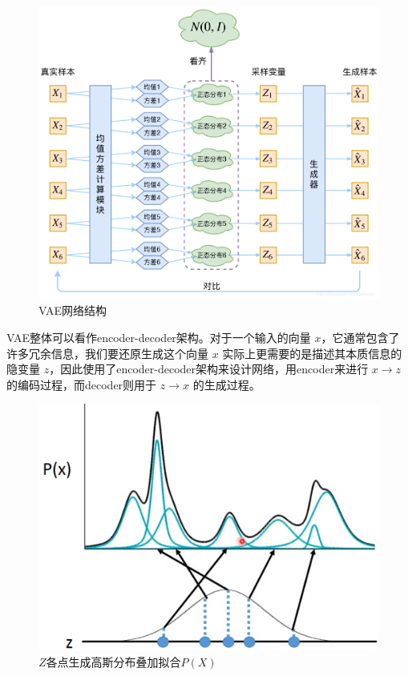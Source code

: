 \documentclass[12pt,a4paper,UTF8]{article}
\begin{document}
\begin{figure}[htb]\centering\includegraphics[scale=0.36]{./figure/3.png}\caption{VAE网络结构}\label{vae_img}\end{figure}

\indent VAE整体可以看作encoder-decoder架构。对于一个输入的向量 $x$，它通常包含了许多冗余信息，我们要还原生成这个向量 $x$ 实际上更需要的是描述其本质信息的隐变量 $z$，因此使用了encoder-decoder架构来设计网络，用encoder来进行 $x\to z$ 的编码过程，而decoder则用于 $z\to x$ 的生成过程。\\

\begin{figure}[htb]\centering\includegraphics[scale=0.5]{./figure/4.png}\caption{$Z$各点生成高斯分布叠加拟合$P\left(X\right)$}\label{dmm_img}\end{figure}
\end{document}
